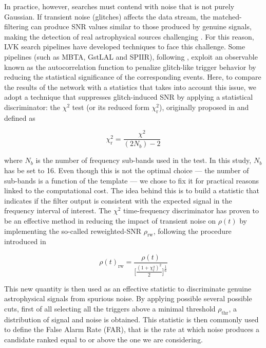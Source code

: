 \documentclass[aps,prd,twocolumn,superscriptaddress,nofootinbib, longbibliography]{revtex4-2}
\begin{document}
	In practice, however, searches must contend with noise that is not purely Gaussian. If transient noise (glitches) affects the data stream, the matched-filtering can produce SNR values similar to those produced by genuine signals, making the detection of real astrophysical sources challenging \cite{BabakGlitchSearches}. For this reason, LVK search pipelines have developed techniques to face this challenge. Some pipelines (such as MBTA, GstLAL and SPIIR), following \cite{gstlal1}, exploit an observable known as the autocorrelation function to penalize glitch-like trigger behavior by reducing the statistical significance of the corresponding events. Here, to compare the results of the network with a statistics that takes into account this issue, we adopt a technique that suppresses glitch-induced SNR by applying a statistical discriminator: the $\chi^2$ test (or its reduced form $\chi^2_\mathrm{r}$), originally proposed in \cite{allen2005_chi2} and defined as
		
 \begin{equation}
	\chi^2_\mathrm{r} = \frac{\chi^2}{(2N_b) - 2}
	\label{eq:chi-sq}
\end{equation}	
	
	where $N_b$ is the number of frequency sub-bands used in the test. In this study, $N_b$ has be set to 16. Even though this is not the optimal choice --- the number of sub-bands is a function of the template \cite{Abbott_2016} --- we chose to fix it for practical reasons linked to the computational cost. The idea behind this is to build a statistic that indicates if the filter output is consistent with the expected signal in the frequency interval of interest. The $\chi^2$ time-frequency discriminator has proven to be an effective method in reducing the impact of transient noise on $\rho(t)$ by implementing the so-called reweighted-SNR $\rho_\mathrm{rw}$, following the procedure introduced in \cite{pycbc2016}
	
\begin{equation}
	\rho(t)_\mathrm{rw} = \frac{\rho(t)}{\Big [ \frac{( 1 + \chi^2_\mathrm{r})^2}{2}\Big ]^{\frac{1}{6}}}
	\label{eq:SNR-rw}
\end{equation}

	This new quantity is then used as an effective statistic to discriminate genuine astrophysical signals from spurious noise. By applying possible several possible cuts, first of all selecting all the triggers above a minimal threshold $\rho_\mathrm{thr}$, a distribution of signal and noise is obtained. This statistic is then commonly used to define the False Alarm Rate (FAR), that is the rate at which noise produces a candidate ranked equal to or above the one we are considering.  
	
\end{document}
